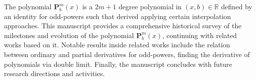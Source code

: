 The polynomial $\mathbf{P}^m_b(x)$ is a $2m+1$ degree polynomial in $(x,b) \in \mathbb{R}$
defined by an identity for odd-powers such that derived applying certain interpolation approaches.
This manuscript provides a comprehensive historical survey of the milestones and evolution of the polynomial
$\mathbf{P}^m_b(x)$, continuing with related works based on it.
Notable results inside related works include the relation between ordinary and partial derivatives for odd-powers,
finding the derivative of polynomials via double limit.
Finally, the manuscript concludes with future research directions and activities.



